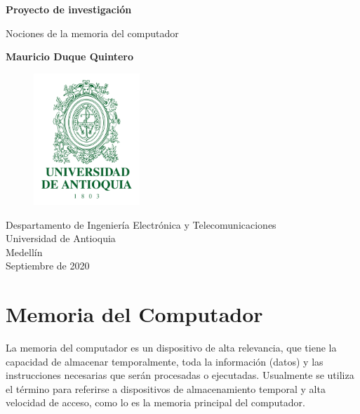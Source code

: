 \documentclass{article}
\begin{document}
\begin{titlepage}
    \begin{center}
        \vspace*{1cm}
            
        \Huge
        \textbf{Proyecto de investigación }
            
        \vspace{0.5cm}
        \LARGE
        Nociones de la memoria del computador
            
        \vspace{2.5cm}
            
        \textbf{Mauricio Duque Quintero }
            
        \vfill
        \begin{figure}[h]
        \includegraphics[width=4cm]{Escudo-UdeA.png}
        \centering
        \label{fig:descarga}
        \end{figure}
     
        \vspace{0.8cm}
            
        \Large
        Despartamento de Ingeniería Electrónica y Telecomunicaciones\\
        Universidad de Antioquia\\
        Medellín\\
        Septiembre de 2020
            
    \end{center}
\end{titlepage}

\tableofcontents

\section{Memoria del Computador}
	La memoria del computador es un dispositivo de alta relevancia, que tiene la capacidad de almacenar temporalmente, toda la información (datos)  y  las instrucciones necesarias que serán procesadas o ejecutadas. Usualmente se utiliza el término para referirse a dispositivos de almacenamiento temporal y alta velocidad de acceso, como lo es la memoria principal del computador.\cite{ecuredwebsite}
\end{document}
